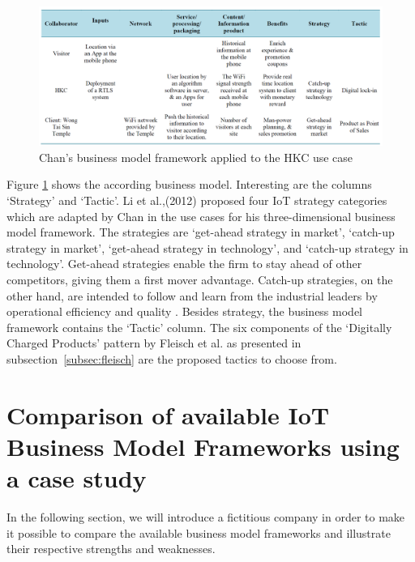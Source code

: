 		\begin{figure}[ht]
		    \begin{center}
		    \includegraphics[scale=0.4]{Talk11/chanexample.png}
		    \end{center}
		    \caption{Chan's business model framework applied to the HKC use case \cite[p.560]{chan}}
		    \label{fig:chan_ex}
		\end{figure}

		Figure \ref{fig:chan_ex} shows the according business model. Interesting are the columns `Strategy' and `Tactic'. Li et al.,(2012) \cite{li} proposed four IoT strategy categories which are adapted by Chan in the use cases for his three-dimensional business model framework. The strategies are `get-ahead strategy in market', `catch-up strategy in market', `get-ahead strategy in technology', and `catch-up strategy in technology'. Get-ahead strategies enable the firm to stay ahead of other competitors, giving them a first mover advantage. Catch-up strategies, on the other hand, are intended to follow and learn from the industrial leaders by operational efficiency and quality \cite{chan}.
		Besides strategy, the business model framework contains the `Tactic' column. The six components of the `Digitally Charged Products' pattern by Fleisch et al. \cite{fleisch} as presented in subsection~\ref{subsec:fleisch} are the proposed tactics to choose from.

\section{Comparison of available IoT Business Model Frameworks using a case study}
\label{sec:bmf_comparison}
	In the following section, we will introduce a fictitious company in order to make it possible to compare the available business model frameworks and illustrate their respective strengths and weaknesses.

